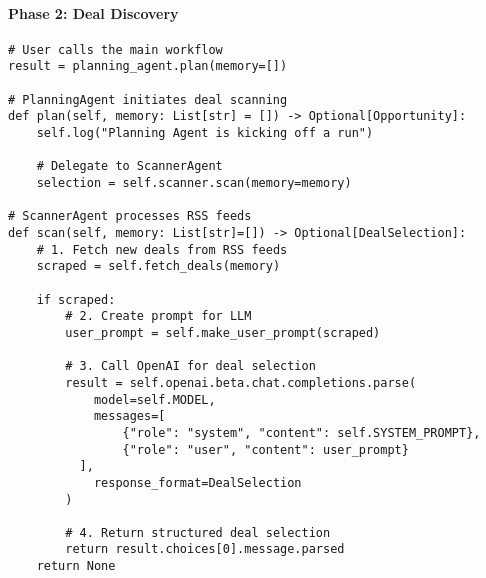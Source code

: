 \paragraph{Phase 2: Deal Discovery}
\begin{lstlisting}[caption=Deal Discovery Process]
# User calls the main workflow
result = planning_agent.plan(memory=[])

# PlanningAgent initiates deal scanning
def plan(self, memory: List[str] = []) -> Optional[Opportunity]:
    self.log("Planning Agent is kicking off a run")
    
    # Delegate to ScannerAgent
    selection = self.scanner.scan(memory=memory)
    
# ScannerAgent processes RSS feeds
def scan(self, memory: List[str]=[]) -> Optional[DealSelection]:
    # 1. Fetch new deals from RSS feeds
    scraped = self.fetch_deals(memory)
    
    if scraped:
        # 2. Create prompt for LLM
        user_prompt = self.make_user_prompt(scraped)
        
        # 3. Call OpenAI for deal selection
        result = self.openai.beta.chat.completions.parse(
            model=self.MODEL,
            messages=[
                {"role": "system", "content": self.SYSTEM_PROMPT},
                {"role": "user", "content": user_prompt}
          ],
            response_format=DealSelection
        )
        
        # 4. Return structured deal selection
        return result.choices[0].message.parsed
    return None
\end{lstlisting}

